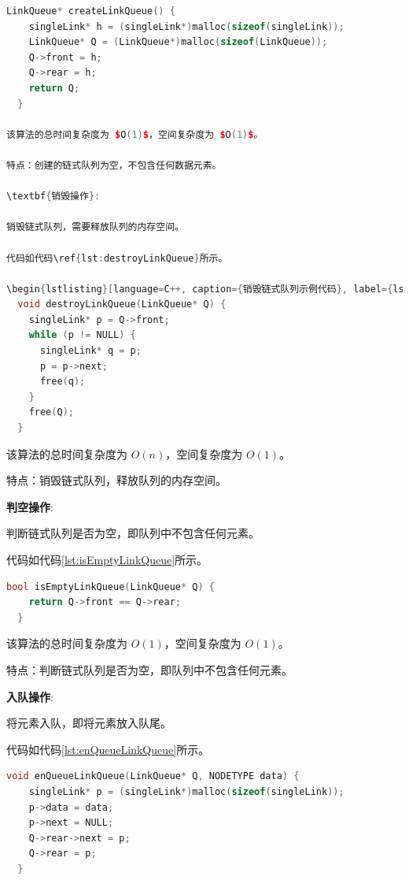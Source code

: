 \documentclass[lang=cn,newtx,10pt,scheme=chinese]{elegantbook}
\begin{document}
\begin{lstlisting}[language=C++, caption={创建一个空链式队列示例代码}, label={lst:createLinkQueue}]
  LinkQueue* createLinkQueue() {
    singleLink* h = (singleLink*)malloc(sizeof(singleLink));
    LinkQueue* Q = (LinkQueue*)malloc(sizeof(LinkQueue));
    Q->front = h;
    Q->rear = h;
    return Q;
  }

该算法的总时间复杂度为 $O(1)$，空间复杂度为 $O(1)$。

特点：创建的链式队列为空，不包含任何数据元素。

\textbf{销毁操作}:

销毁链式队列，需要释放队列的内存空间。

代码如代码\ref{lst:destroyLinkQueue}所示。

\begin{lstlisting}[language=C++, caption={销毁链式队列示例代码}, label={lst:destroyLinkQueue}]
  void destroyLinkQueue(LinkQueue* Q) {
    singleLink* p = Q->front;
    while (p != NULL) {
      singleLink* q = p;
      p = p->next;
      free(q);
    }
    free(Q);
  }

\end{lstlisting}

该算法的总时间复杂度为 $O(n)$，空间复杂度为 $O(1)$。

特点：销毁链式队列，释放队列的内存空间。

\textbf{判空操作}:

判断链式队列是否为空，即队列中不包含任何元素。

代码如代码\ref{lst:isEmptyLinkQueue}所示。

\begin{lstlisting}[language=C++, caption={判断链式队列是否为空示例代码}, label={lst:isEmptyLinkQueue}]
  bool isEmptyLinkQueue(LinkQueue* Q) {
    return Q->front == Q->rear;
  }

\end{lstlisting}

该算法的总时间复杂度为 $O(1)$，空间复杂度为 $O(1)$。

特点：判断链式队列是否为空，即队列中不包含任何元素。

\textbf{入队操作}:

将元素入队，即将元素放入队尾。

代码如代码\ref{lst:enQueueLinkQueue}所示。

\begin{lstlisting}[language=C++, caption={入队示例代码}, label={lst:enQueueLinkQueue}]
  void enQueueLinkQueue(LinkQueue* Q, NODETYPE data) {
    singleLink* p = (singleLink*)malloc(sizeof(singleLink));
    p->data = data;
    p->next = NULL;
    Q->rear->next = p;
    Q->rear = p;
  }

\end{lstlisting}
\end{document}
